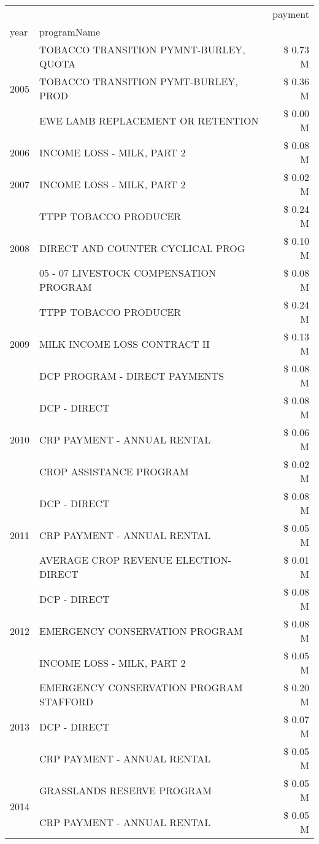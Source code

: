 \begin{tabular}{llr}
\toprule
 &  & payment \\
year & programName &  \\
\midrule
\multirow[t]{3}{*}{2005} & TOBACCO TRANSITION PYMNT-BURLEY, QUOTA & \$ 0.73 M \\
 & TOBACCO TRANSITION PYMT-BURLEY, PROD & \$ 0.36 M \\
 & EWE LAMB REPLACEMENT OR RETENTION & \$ 0.00 M \\
\cline{1-3}
2006 & INCOME LOSS - MILK, PART 2 & \$ 0.08 M \\
\cline{1-3}
2007 & INCOME LOSS - MILK, PART 2 & \$ 0.02 M \\
\cline{1-3}
\multirow[t]{3}{*}{2008} & TTPP TOBACCO PRODUCER & \$ 0.24 M \\
 & DIRECT AND COUNTER CYCLICAL PROG & \$ 0.10 M \\
 & 05 - 07 LIVESTOCK COMPENSATION PROGRAM & \$ 0.08 M \\
\cline{1-3}
\multirow[t]{3}{*}{2009} & TTPP TOBACCO PRODUCER & \$ 0.24 M \\
 & MILK INCOME LOSS CONTRACT II & \$ 0.13 M \\
 & DCP PROGRAM - DIRECT PAYMENTS & \$ 0.08 M \\
\cline{1-3}
\multirow[t]{3}{*}{2010} & DCP - DIRECT & \$ 0.08 M \\
 & CRP PAYMENT - ANNUAL RENTAL & \$ 0.06 M \\
 & CROP ASSISTANCE PROGRAM & \$ 0.02 M \\
\cline{1-3}
\multirow[t]{3}{*}{2011} & DCP - DIRECT & \$ 0.08 M \\
 & CRP PAYMENT - ANNUAL RENTAL & \$ 0.05 M \\
 & AVERAGE CROP REVENUE ELECTION-DIRECT & \$ 0.01 M \\
\cline{1-3}
\multirow[t]{3}{*}{2012} & DCP - DIRECT & \$ 0.08 M \\
 & EMERGENCY CONSERVATION PROGRAM & \$ 0.08 M \\
 & INCOME LOSS - MILK, PART 2 & \$ 0.05 M \\
\cline{1-3}
\multirow[t]{3}{*}{2013} & EMERGENCY CONSERVATION PROGRAM STAFFORD & \$ 0.20 M \\
 & DCP - DIRECT & \$ 0.07 M \\
 & CRP PAYMENT - ANNUAL RENTAL & \$ 0.05 M \\
\cline{1-3}
\multirow[t]{3}{*}{2014} & GRASSLANDS RESERVE PROGRAM & \$ 0.05 M \\
 & CRP PAYMENT - ANNUAL RENTAL & \$ 0.05 M \\

\end{tabular}
